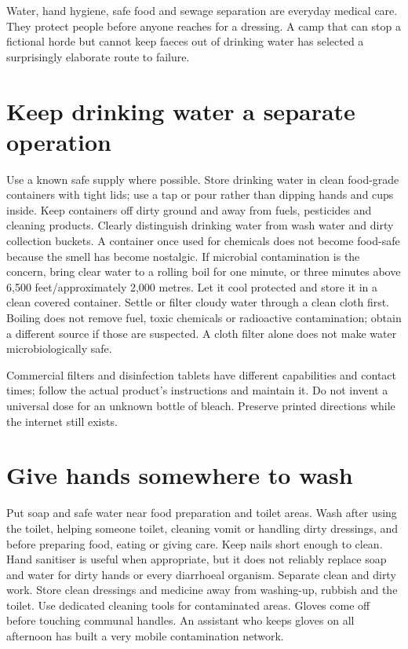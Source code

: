 \documentclass[10pt,openright]{book}
\begin{document}
Water, hand hygiene, safe food and sewage separation are everyday medical care. They protect people before anyone reaches for a dressing. A camp that can stop a fictional horde but cannot keep faeces out of drinking water has selected a surprisingly elaborate route to failure.

\section*{Keep drinking water a separate operation}
Use a known safe supply where possible. Store drinking water in clean food-grade containers with tight lids; use a tap or pour rather than dipping hands and cups inside. Keep containers off dirty ground and away from fuels, pesticides and cleaning products. Clearly distinguish drinking water from wash water and dirty collection buckets. A container once used for chemicals does not become food-safe because the smell has become nostalgic. If microbial contamination is the concern, bring clear water to a rolling boil for one minute, or three minutes above 6,500 feet/approximately 2,000 metres. Let it cool protected and store it in a clean covered container. Settle or filter cloudy water through a clean cloth first. Boiling does not remove fuel, toxic chemicals or radioactive contamination; obtain a different source if those are suspected. A cloth filter alone does not make water microbiologically safe.

Commercial filters and disinfection tablets have different capabilities and contact times; follow the actual product's instructions and maintain it. Do not invent a universal dose for an unknown bottle of bleach. Preserve printed directions while the internet still exists.

\section*{Give hands somewhere to wash}
Put soap and safe water near food preparation and toilet areas. Wash after using the toilet, helping someone toilet, cleaning vomit or handling dirty dressings, and before preparing food, eating or giving care. Keep nails short enough to clean. Hand sanitiser is useful when appropriate, but it does not reliably replace soap and water for dirty hands or every diarrhoeal organism. Separate clean and dirty work. Store clean dressings and medicine away from washing-up, rubbish and the toilet. Use dedicated cleaning tools for contaminated areas. Gloves come off before touching communal handles. An assistant who keeps gloves on all afternoon has built a very mobile contamination network.
\end{document}
